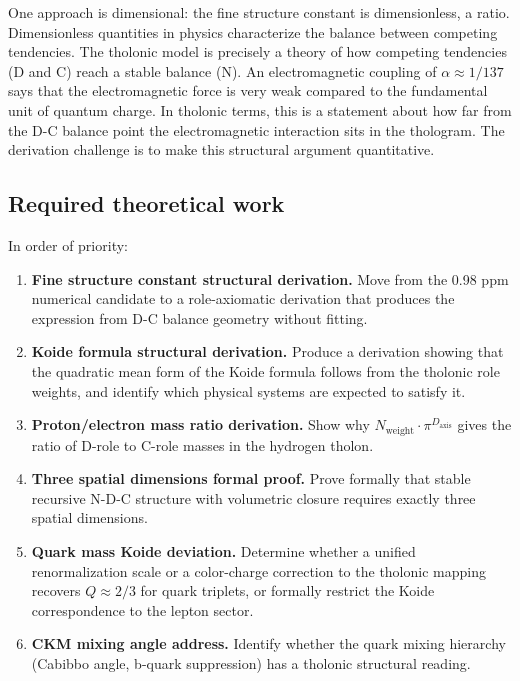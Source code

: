 \documentclass[12pt]{article}
\providecommand{\tightlist}{%
  \setlength{\itemsep}{0pt}\setlength{\parskip}{0pt}}
\begin{document}
One approach is dimensional: the fine structure constant is
dimensionless, a ratio. Dimensionless quantities in physics characterize
the balance between competing tendencies. The tholonic model is
precisely a theory of how competing tendencies (D and C) reach a stable
balance (N). An electromagnetic coupling of \(\alpha \approx 1/137\)
says that the electromagnetic force is very weak compared to the
fundamental unit of quantum charge. In tholonic terms, this is a
statement about how far from the D-C balance point the electromagnetic
interaction sits in the thologram. The derivation challenge is to make
this structural argument quantitative.

\subsection{Required theoretical work}\label{required-theoretical-work}

In order of priority:

\begin{enumerate}
\def\labelenumi{\arabic{enumi}.}
\tightlist
\item
  \textbf{Fine structure constant structural derivation.} Move from the
  0.98 ppm numerical candidate to a role-axiomatic derivation that
  produces the expression from D-C balance geometry without fitting.
\item
  \textbf{Koide formula structural derivation.} Produce a derivation
  showing that the quadratic mean form of the Koide formula follows from
  the tholonic role weights, and identify which physical systems are
  expected to satisfy it.
\item
  \textbf{Proton/electron mass ratio derivation.} Show why
  \(N_{\text{weight}} \cdot \pi^{D_{\text{axis}}}\) gives the ratio of
  D-role to C-role masses in the hydrogen tholon.
\item
  \textbf{Three spatial dimensions formal proof.} Prove formally that
  stable recursive N-D-C structure with volumetric closure requires
  exactly three spatial dimensions.
\item
  \textbf{Quark mass Koide deviation.} Determine whether a unified
  renormalization scale or a color-charge correction to the tholonic
  mapping recovers \(Q \approx 2/3\) for quark triplets, or formally
  restrict the Koide correspondence to the lepton sector.
\item
  \textbf{CKM mixing angle address.} Identify whether the quark mixing
  hierarchy (Cabibbo angle, b-quark suppression) has a tholonic
  structural reading.
\end{enumerate}
\end{document}
